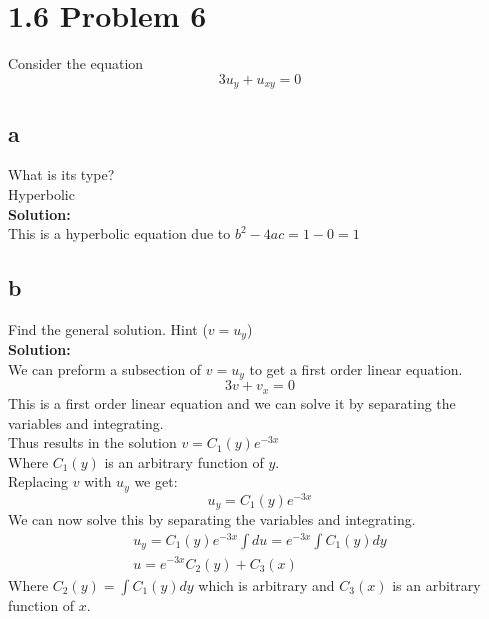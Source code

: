 \documentclass{article}
\begin{document}
\section*{1.6 Problem 6 }
Consider the equation
$$ 3u_y + u_{xy} = 0$$
\subsection*{a}
What is its type?\\
Hyperbolic\\
\textbf{Solution:}\\
This is a hyperbolic equation due to $b^2 - 4ac = 1 - 0 = 1$\\

\subsection*{b}
Find the general solution. Hint ($v = u_y$)\\
\textbf{Solution:}\\
We can preform a subsection of $v = u_y$ to get a first order linear equation.\\
$$ 3v + v_x = 0$$
This is a first order linear equation and we can solve it by separating the variables and integrating.\\
Thus results in the solution $v = {C_1(y)}e^{-3x}$\\
Where $C_1(y)$ is an arbitrary function of $y$.\\
Replacing $v$ with $u_y$ we get:
$$ u_y = C_1(y)e^{-3x}$$
We can now solve this by separating the variables and integrating.\\
\begin{align*}
    u_y = C_1(y)e^{-3x}
    \int du = e^{-3x}\int C_1(y) dy\\
    u = e^{-3x}C_2(y) + C_3(x)
\end{align*}
Where $C_2(y) = \int C_1(y) dy $ which is arbitrary and $C_3(x)$ is an arbitrary function of $x$.\\ 
\end{document}
